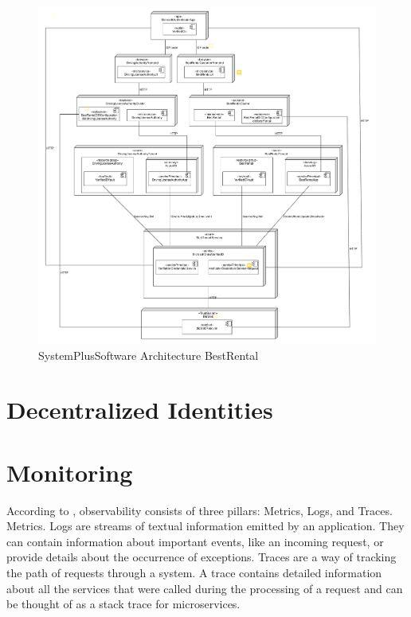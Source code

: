 \begin{figure}
	\centering
	\includegraphics[width=\textwidth]{pdfs/sps_achitecture_bestrental.pdf}
	\caption{SystemPlusSoftware Architecture BestRental}
	\label{fig:sps_architecture_bestrental}
\end{figure}

\section{Decentralized Identities}

\section{Monitoring}

According to \cite{9837035}, observability consists of three pillars: Metrics, Logs, and Traces.
Metrics.
Logs are streams of textual information emitted by an application. They can contain information about important
events, like an incoming request, or provide details about the occurrence of exceptions.
Traces are a way of tracking the path of requests through a system. A trace contains detailed information
about all the services that were called during the processing of a request and can be thought of
as a stack trace for microservices.

